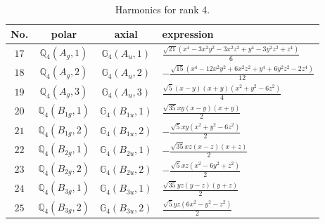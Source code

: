 \documentclass[fleqn,8pt,landscape]{jsarticle}
\begin{document}
\begin{table}[ht!]
\begin{center}
\caption{Harmonics for rank 4.}
\renewcommand{\arraystretch}{1.3}
\begin{tabular}{cccl} \hline \hline
No. & polar & axial & expression \\ \hline
$ 17 $ & $ \mathbb{Q}_{4}(A_{g},1) $ & $ \mathbb{G}_{4}(A_{u},1) $ & $ \frac{\sqrt{21} \left(x^{4} - 3 x^{2} y^{2} - 3 x^{2} z^{2} + y^{4} - 3 y^{2} z^{2} + z^{4}\right)}{6} $ \\
$ 18 $ & $ \mathbb{Q}_{4}(A_{g},2) $ & $ \mathbb{G}_{4}(A_{u},2) $ & $ - \frac{\sqrt{15} \left(x^{4} - 12 x^{2} y^{2} + 6 x^{2} z^{2} + y^{4} + 6 y^{2} z^{2} - 2 z^{4}\right)}{12} $ \\
$ 19 $ & $ \mathbb{Q}_{4}(A_{g},3) $ & $ \mathbb{G}_{4}(A_{u},3) $ & $ \frac{\sqrt{5} \left(x - y\right) \left(x + y\right) \left(x^{2} + y^{2} - 6 z^{2}\right)}{4} $ \\
$ 20 $ & $ \mathbb{Q}_{4}(B_{1g},1) $ & $ \mathbb{G}_{4}(B_{1u},1) $ & $ \frac{\sqrt{35} x y \left(x - y\right) \left(x + y\right)}{2} $ \\
$ 21 $ & $ \mathbb{Q}_{4}(B_{1g},2) $ & $ \mathbb{G}_{4}(B_{1u},2) $ & $ - \frac{\sqrt{5} x y \left(x^{2} + y^{2} - 6 z^{2}\right)}{2} $ \\
$ 22 $ & $ \mathbb{Q}_{4}(B_{2g},1) $ & $ \mathbb{G}_{4}(B_{2u},1) $ & $ - \frac{\sqrt{35} x z \left(x - z\right) \left(x + z\right)}{2} $ \\
$ 23 $ & $ \mathbb{Q}_{4}(B_{2g},2) $ & $ \mathbb{G}_{4}(B_{2u},2) $ & $ - \frac{\sqrt{5} x z \left(x^{2} - 6 y^{2} + z^{2}\right)}{2} $ \\
$ 24 $ & $ \mathbb{Q}_{4}(B_{3g},1) $ & $ \mathbb{G}_{4}(B_{3u},1) $ & $ \frac{\sqrt{35} y z \left(y - z\right) \left(y + z\right)}{2} $ \\
$ 25 $ & $ \mathbb{Q}_{4}(B_{3g},2) $ & $ \mathbb{G}_{4}(B_{3u},2) $ & $ \frac{\sqrt{5} y z \left(6 x^{2} - y^{2} - z^{2}\right)}{2} $ \\
 \hline \hline
\end{tabular}
\end{center}
\end{table}
\end{document}
